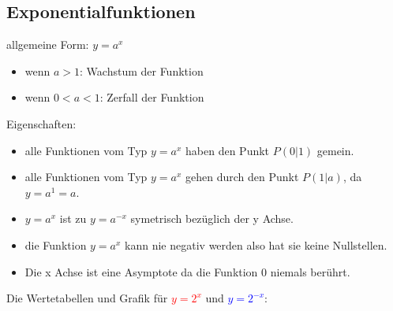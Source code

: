 \newpage
\subsection{Exponentialfunktionen}


allgemeine Form: $y=a^x$
\begin{itemize}
    \item wenn $a>1$: Wachstum der Funktion
    \item wenn $0<a<1$: Zerfall der Funktion
\end{itemize}

\hfill \break
Eigenschaften:
\begin{itemize}
    \item alle Funktionen vom Typ $y=a^x$ haben den Punkt $P(0|1)$ gemein.
    \item alle Funktionen vom Typ $y=a^x$ gehen durch den Punkt $P(1|a)$, da $y=a^1 = a$.
    \item $y=a^x$ ist zu $y=a^{-x}$ symetrisch bezüglich der y Achse.
    \item die Funktion $y=a^x$ kann nie negativ werden also hat sie keine Nullstellen.
    \item Die x Achse ist eine Asymptote da die Funktion 0 niemals berührt.
\end{itemize}

\hfill \break
Die Wertetabellen und Grafik für \textcolor{red}{$y=2^x$} und \textcolor{blue}{$y=2^{-x}$}:\\

\hfill \break
\fboxrule=0.8pt 

\hfill \break
{}